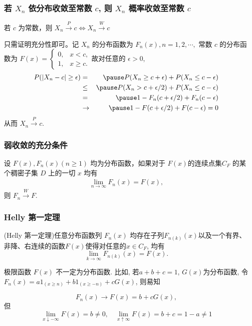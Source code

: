 \begin{frame}
	\frametitle{若 $X_n$ 依分布收敛至常数 $c$, 则 $X_n$ 概率收敛至常数 $c$}
	\begin{thm}
		若 $c$ 为常数，则 $X_n\stackrel{P}{\rightarrow} c\Leftrightarrow X_n\stackrel{W}{\rightarrow} c$
	\end{thm}

	\pause 只需证明充分性即可。记 $X_n$ 的分布函数为 $F_n (x), n=1,2,\cdots, $ 常数 $c$ 的分布函数为 $F (x)=\left\{
	\begin{array}{ll}
		0, &x<c,\\
		1, &x\ge c.
	\end{array}\right.
	$\pause 故对任意的 $\epsilon>0$,
	\begin{eqnarray*}
		P(|X_n-c|\ge \epsilon)&=&\pause P(X_n\ge c+\epsilon)+P(X_n\le c-\epsilon)\\
		&\le&\pause  P(X_n> c+\epsilon/2)+P(X_n\le c-\epsilon)\\
		&=&\pause 1-F_n(c+\epsilon/2)+F_n(c-\epsilon)\\
		&\rightarrow& \pause 1-F(c+\epsilon/2)+F(c-\epsilon)=0
	\end{eqnarray*}
	\pause 从而 $X_n\stackrel{P}{\rightarrow} c$.
\end{frame}


\begin{frame}
	\frametitle{弱收敛的充分条件}
	\begin{thm}
		设 $F (x), F_n (x)(n\geq 1)$ 均为分布函数，如果对于 $F(x)$的连续点集$C_F$ 的某个稠密子集 $D$ 上的一切 $x$ 均有
		\begin{eqnarray*}
			\lim_{n\rightarrow\infty}F_n(x)=F(x),
		\end{eqnarray*}
		则 $F_n\stackrel{W}\rightarrow F$.
	\end{thm}

\end{frame}


\begin{frame}
	\frametitle{{\rm Helly} 第一定理}
	\begin{thm}
		({\rm Helly} 第一定理)任意分布函数列 $F_n(x)$ 均存在子列$F_{n(k)}(x)$以及一个有界、非降、右连续的函数$F(x)$使得对任意的$x\in C_F$, 均有
		\[\lim _{k \rightarrow \infty} F_{n(k)}(x)=F(x).\]  %
	\end{thm}\pause
\begin{rmk}
极限函数 $F(x)$ 不一定为分布函数. \pause 比如, 若$a+b+c=1$, $G(x)$为分布函数, 令$F_{n}(x)=a 1_{(x \geq n)}+b 1_{(x \geq-n)}+c G(x)$, 则易知\begin{pauses}
	\[F_{n}(x) \rightarrow F(x)=b+c G(x),\]\pause
	但
	\[\lim _{x \downarrow-\infty} F(x)=b\neq 0, \quad  \lim _{x \uparrow \infty} F(x)=b+c=1-a\neq 1\]
\end{pauses}
\end{rmk}



\end{frame}


